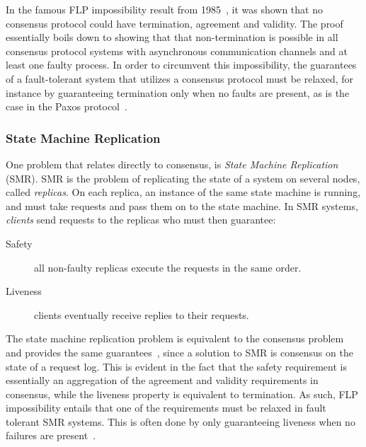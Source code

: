 \documentclass{article}
\begin{document}
		In the famous FLP impossibility result from 1985~\cite{fischer_impossibility_1985}, it was shown that no consensus protocol could have termination, agreement and validity.
		The proof essentially boils down to showing that that non-termination is possible in all consensus protocol systems with asynchronous communication channels and at least one faulty process.
		In order to circumvent this impossibility, the guarantees of a fault-tolerant system that utilizes a consensus protocol must be relaxed, for instance by guaranteeing termination only when no faults are present, as is the case in the Paxos protocol~\cite{lamport_part-time_1998}.

		\subsubsection{State Machine Replication}

		One problem that relates directly to consensus, is \textit{State Machine Replication}~\cite{schneider_implementing_1990} (SMR).
		SMR is the problem of replicating the state of a system on several nodes, called \textit{replicas}.
		On each replica, an instance of the same state machine is running, and must take requests and pass them on to the state machine.
		In SMR systems, \textit{clients} send requests to the replicas who must then guarantee:
		\begin{description}
			\item[Safety] all non-faulty replicas execute the requests in the same order.
			\item[Liveness] clients eventually receive replies to their requests.
		\end{description}
		The state machine replication problem is equivalent to the consensus problem and provides the same guarantees~\cite{schneider_implementing_1990}, since a solution to SMR is consensus on the state of a request log.
		This is evident in the fact that the safety requirement is essentially an aggregation of the agreement and validity requirements in consensus, while the liveness property is equivalent to termination.
		As such, FLP impossibility entails that one of the requirements must be relaxed in fault tolerant SMR systems.
		This is often done by only guaranteeing liveness when no failures are present~\cite{chandra_unreliable_1996,lamport_part-time_1998,castro_practical_1999,kotla_zyzzyva_2007}.
\end{document}

